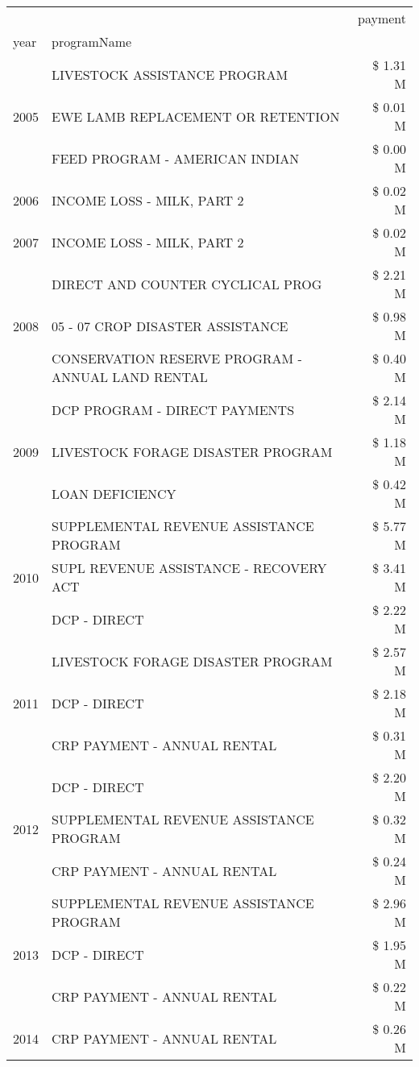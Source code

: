 \begin{tabular}{llr}
\toprule
 &  & payment \\
year & programName &  \\
\midrule
\multirow[t]{3}{*}{2005} & LIVESTOCK ASSISTANCE PROGRAM & \$ 1.31 M \\
 & EWE LAMB REPLACEMENT OR RETENTION & \$ 0.01 M \\
 & FEED PROGRAM - AMERICAN INDIAN & \$ 0.00 M \\
\cline{1-3}
2006 & INCOME LOSS - MILK, PART 2 & \$ 0.02 M \\
\cline{1-3}
2007 & INCOME LOSS - MILK, PART 2 & \$ 0.02 M \\
\cline{1-3}
\multirow[t]{3}{*}{2008} & DIRECT AND COUNTER CYCLICAL PROG & \$ 2.21 M \\
 & 05 - 07 CROP DISASTER ASSISTANCE & \$ 0.98 M \\
 & CONSERVATION RESERVE PROGRAM - ANNUAL LAND RENTAL & \$ 0.40 M \\
\cline{1-3}
\multirow[t]{3}{*}{2009} & DCP PROGRAM - DIRECT PAYMENTS & \$ 2.14 M \\
 & LIVESTOCK FORAGE DISASTER  PROGRAM & \$ 1.18 M \\
 & LOAN DEFICIENCY & \$ 0.42 M \\
\cline{1-3}
\multirow[t]{3}{*}{2010} & SUPPLEMENTAL REVENUE ASSISTANCE PROGRAM & \$ 5.77 M \\
 & SUPL REVENUE ASSISTANCE - RECOVERY ACT & \$ 3.41 M \\
 & DCP - DIRECT & \$ 2.22 M \\
\cline{1-3}
\multirow[t]{3}{*}{2011} & LIVESTOCK FORAGE DISASTER PROGRAM & \$ 2.57 M \\
 & DCP - DIRECT & \$ 2.18 M \\
 & CRP PAYMENT - ANNUAL RENTAL & \$ 0.31 M \\
\cline{1-3}
\multirow[t]{3}{*}{2012} & DCP - DIRECT & \$ 2.20 M \\
 & SUPPLEMENTAL REVENUE ASSISTANCE PROGRAM & \$ 0.32 M \\
 & CRP PAYMENT - ANNUAL RENTAL & \$ 0.24 M \\
\cline{1-3}
\multirow[t]{3}{*}{2013} & SUPPLEMENTAL REVENUE ASSISTANCE PROGRAM & \$ 2.96 M \\
 & DCP - DIRECT & \$ 1.95 M \\
 & CRP PAYMENT - ANNUAL RENTAL & \$ 0.22 M \\
\cline{1-3}
\multirow[t]{3}{*}{2014} & CRP PAYMENT - ANNUAL RENTAL & \$ 0.26 M \\

\end{tabular}
